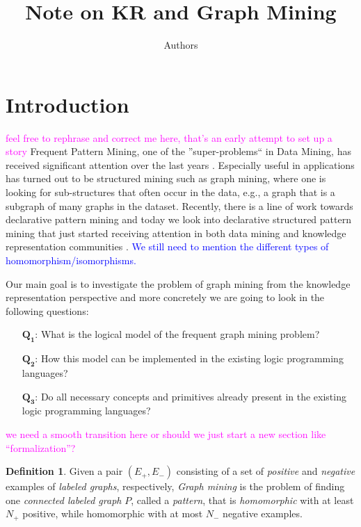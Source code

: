 \documentclass{article}
\author{Authors}
\title{Note on KR and Graph Mining}
\theoremstyle{definition}
\newtheorem{definition}{Definition}[section]
\newcommand{\pair}[1]{\ensuremath{\left(#1\right)}}
\newcommand{\sergey}[1]{\textcolor{magenta}{\marginpar{\sc Sergey} #1}}
\newcommand{\matthias}[1]{\textcolor{blue}{\marginpar{\sc Matthias} #1}}
\newcommand{\Qone}{$\boldsymbol{Q_1}$\xspace}
\newcommand{\Qtwo}{$\boldsymbol{Q_2}$\xspace}
\newcommand{\Qthree}{$\boldsymbol{Q_3}$\xspace}
\begin{document}
\maketitle

\section{Introduction}
\sergey{feel free to rephrase and correct me here, that's an early attempt to set up a story}
Frequent Pattern Mining, one of the ''super-problems`` in Data Mining, has received significant attention over the last years \citep{pattern_mining_book}. Especially useful in applications has turned out to be structured mining such as graph mining, where one is looking for sub-structures that often occur in the data, e.g., a graph that is a subgraph of many graphs in the dataset. Recently, there is a line of work towards declarative pattern mining \citep{tias_declarative_pattern_mining} and today we look into declarative structured pattern mining that just started receiving attention in both data mining and knowledge representation communities \citep{cp_sequence_mining,ilp_graph_mining}. \matthias{We still need to mention the different types of homomorphism/isomorphisms.}

Our main goal is to investigate the problem of graph mining from the knowledge representation perspective and more concretely we are going to look in the following questions:
\begin{itemize}
  \item[\Qone:]   What is the logical model of the frequent graph mining problem?
  \item[\Qtwo:]   How this model can be implemented in the existing logic programming languages?
  \item[\Qthree:] Do all necessary concepts and primitives already present in the existing logic programming languages?
\end{itemize}

\sergey{we need a smooth transition here or should we just start a new section like ``formalization''?}

\begin{definition}
\label{def:GM1}
Given a pair $\pair{E_{+},E_{-}}$ consisting of a set of \emph{positive} and \emph{negative} examples of \emph{labeled graphs}, respectively,
\emph{Graph mining} is the problem of finding one \emph{connected labeled graph} $P$, called a \emph{pattern},
that is \emph{homomorphic} with at least $N_{+}$ positive, while homomorphic with at most $N_{-}$ negative examples.
\end{definition}
\end{document}
